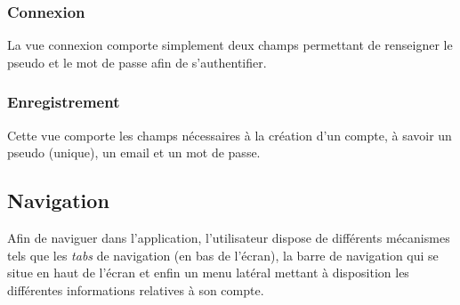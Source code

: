 \subsubsection{Connexion}
La vue connexion comporte simplement deux champs permettant de renseigner le pseudo et le mot de passe afin de s'authentifier.

\subsubsection{Enregistrement}
Cette vue comporte les champs nécessaires à la création d'un compte, à savoir un pseudo (unique), un email et un mot de passe.

\subsection{Navigation}
Afin de naviguer dans l'application, l'utilisateur dispose de différents mécanismes tels que les \textit{tabs} de navigation (en bas de l'écran), la barre de navigation qui se situe en haut de l'écran et enfin un menu latéral mettant à disposition les différentes informations relatives à son compte.
